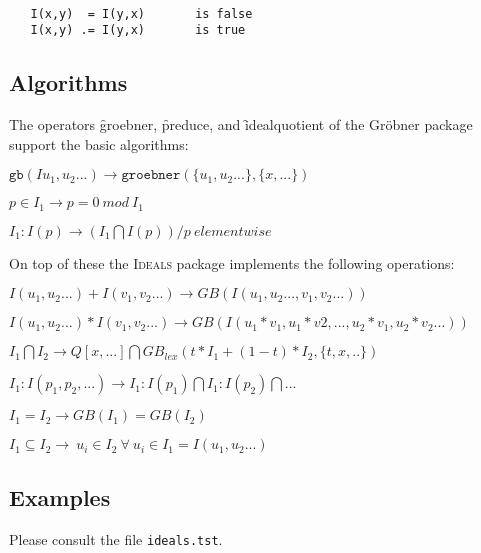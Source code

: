 \begin{verbatim}

   I(x,y)  = I(y,x)       is false
   I(x,y) .= I(y,x)       is true

\end{verbatim}

\subsection{Algorithms}

The operators \f{groebner}, \f{preduce}, and \f{idealquotient} of the
%
%
%
\REDUCE Gr\"obner package support the basic algorithms:

$\mathtt{gb}(Iu_1,u_2...) \rightarrow \mathtt{groebner}(\{u_1,u_2...\},\{x,...\})$

$p \in I_1 \rightarrow p=0 \ mod \ I_1$

$I_1 : I(p) \rightarrow (I_1 \bigcap I(p)) / p \ elementwise$

\noindent
On top of these the \textsc{Ideals} package implements the following 
operations:


$I(u_1,u_2...)+I(v_1,v_2...) \rightarrow GB(I(u_1,u_2...,v_1,v_2...))$


$I(u_1,u_2...)*I(v_1,v_2...)\rightarrow 
 GB(I(u_1*v_1,u_1*v2,...,u_2*v_1,u_2*v_2...))$


$I_1 \bigcap I_2 \rightarrow
  Q[x,...] \bigcap GB_{lex}(t*I_1 + (1-t)*I_2,\{t,x,..\}) $


$I_1 : I(p_1,p_2,...) \rightarrow I_1 : I(p_1) \bigcap I_1 : I(p_2)
\bigcap ...$

$I_1 = I_2 \rightarrow GB(I_1)=GB(I_2)$

$I_1 \subseteq I_2
   \rightarrow \ u_i \in I_2 \ \forall \ u_i \in I_1=I(u_1,u_2...)$

\subsection{Examples}

Please consult the file \texttt{ideals.tst}.
